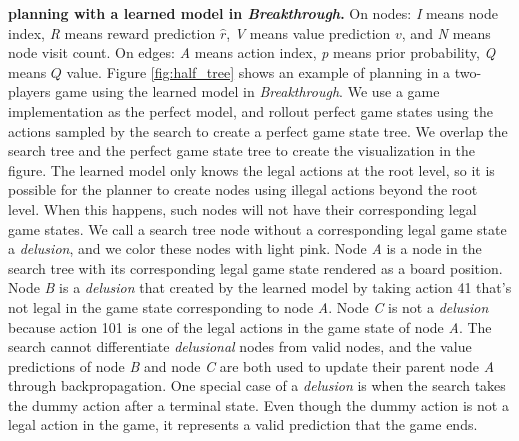 {
    \textbf{\moozi planning with a learned model in \textit{Breakthrough}.}}
{
    On nodes: \textit{I} means node index, \textit{R} means reward prediction \(\hat{r}\), \textit{V} means value prediction $v$, and \textit{N} means node visit count.
    On edges: \textit{A} means action index, \textit{p} means prior probability, \textit{Q} means $Q$ value.
}
Figure \ref{fig:half_tree} shows an example of \moozi planning in a two-players game using the learned model in \textit{Breakthrough}.
We use a game implementation as the perfect model, and rollout perfect game states using the actions sampled by the search to create a perfect game state tree.
We overlap the \moozi search tree and the perfect game state tree to create the visualization in the figure.
The learned model only knows the legal actions at the root level, so it is possible for the planner to create nodes using illegal actions beyond the root level.
When this happens, such nodes will not have their corresponding legal game states.
We call a search tree node without a corresponding legal game state a \textit{delusion}, and we color these nodes with light pink.
Node \textit{A} is a node in the search tree with its corresponding legal game state rendered as a board position.
Node \textit{B} is a \textit{delusion} that created by the learned model by taking action 41 that's not legal in the game state corresponding to node \textit{A}.
Node \textit{C} is not a \textit{delusion} because action 101 is one of the legal actions in the game state of node \textit{A}.
The search cannot differentiate \textit{delusional} nodes from valid nodes, and the value predictions of node \textit{B} and node \textit{C} are both used to update their parent node \textit{A} through backpropagation.
One special case of a \textit{delusion} is when the search takes the dummy action after a terminal state.
Even though the dummy action is not a legal action in the game, it represents a valid prediction that the game ends.


